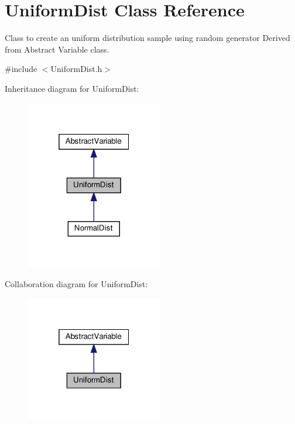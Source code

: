 \hypertarget{classUniformDist}{}\section{Uniform\+Dist Class Reference}
\label{classUniformDist}


Class to create an uniform distribution sample using random generator Derived from Abstract Variable class.  




{\ttfamily \#include $<$Uniform\+Dist.\+h$>$}



Inheritance diagram for Uniform\+Dist\+:\nopagebreak
\begin{figure}[H]
\begin{center}
\leavevmode
\includegraphics[width=169pt]{classUniformDist__inherit__graph}
\end{center}
\end{figure}


Collaboration diagram for Uniform\+Dist\+:\nopagebreak
\begin{figure}[H]
\begin{center}
\leavevmode
\includegraphics[width=169pt]{classUniformDist__coll__graph}
\end{center}
\end{figure}

